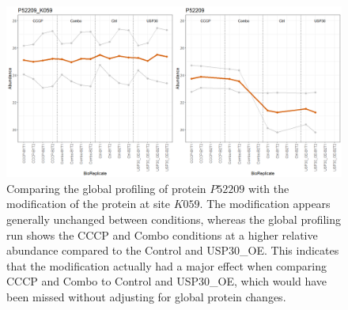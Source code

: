 \documentclass[mcp]{article}
\numberwithin{figure}{section} %
\numberwithin{table}{section}
\begin{document}
\begin{figure}[ht]
\centering
\includegraphics[width=1\textwidth]{images/USP30_profile_plot.png}
\caption{Comparing the global profiling of protein $P52209$ with the modification of the protein at site $K059$. The modification appears generally unchanged between conditions, whereas the global profiling run shows the CCCP and Combo conditions at a higher relative abundance compared to the Control and USP30\_OE. This indicates that the modification actually had a major effect when comparing CCCP and Combo to Control and USP30\_OE, which would have been missed without adjusting for global protein changes.}
\label{fig:usp30_profile}
\end{figure}

\end{document}
